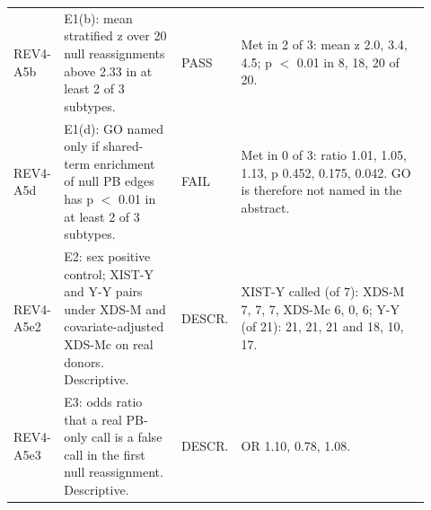 \begin{table}[p]
\begin{tabular}{@{}>{\raggedright\arraybackslash}p{0.100\linewidth}>{\raggedright\arraybackslash}p{0.285\linewidth}>{\raggedright\arraybackslash}p{0.085\linewidth}>{\raggedright\arraybackslash}p{0.450\linewidth}@{}}
REV4-A5b & E1(b): mean stratified z over 20 null reassignments above 2.33 in at least 2 of 3 subtypes. & PASS & Met in 2 of 3: mean z 2.0, 3.4, 4.5; p $<$ 0.01 in 8, 18, 20 of 20. \\
REV4-A5d & E1(d): GO named only if shared-term enrichment of null PB edges has p $<$ 0.01 in at least 2 of 3 subtypes. & FAIL & Met in 0 of 3: ratio 1.01, 1.05, 1.13, p 0.452, 0.175, 0.042. GO is therefore not named in the abstract. \\
REV4-A5e2 & E2: sex positive control; XIST-Y and Y-Y pairs under XDS-M and covariate-adjusted XDS-Mc on real donors. Descriptive. & DESCR. & XIST-Y called (of 7): XDS-M 7, 7, 7, XDS-Mc 6, 0, 6; Y-Y (of 21): 21, 21, 21 and 18, 10, 17. \\
REV4-A5e3 & E3: odds ratio that a real PB-only call is a false call in the first null reassignment. Descriptive. & DESCR. & OR 1.10, 0.78, 1.08. \\
\bottomrule
\end{tabular}
\end{table}
